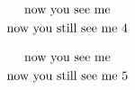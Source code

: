 \documentclass{article}
\begin{document}
\begin{gather*}
\mbox{now you see me}\\
\makebox[1pt]{now you still see me 4}
\end{gather*}

\begin{gather*}
\mbox{now you see me}\\
\makebox[0pt]{now you still see me 5}
\end{gather*}
\end{document}

